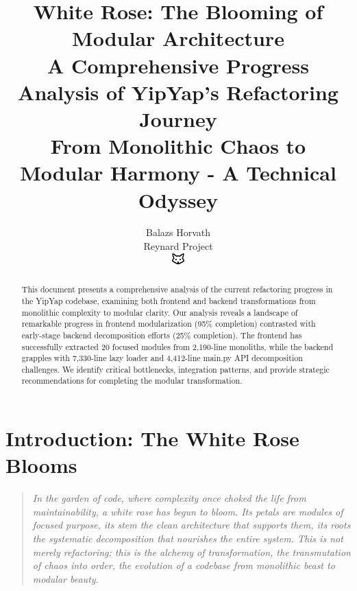 \documentclass[11pt]{article}
\begin{document}
\title{\textbf{White Rose: The Blooming of Modular Architecture} \\
\Large{A Comprehensive Progress Analysis of YipYap's Refactoring Journey} \\
\large{From Monolithic Chaos to Modular Harmony - A Technical Odyssey}}

\author{Balazs Horvath\\
Reynard Project\\
\includegraphics[width=0.5cm]{../../shared-assets/favicon.pdf}}

\maketitle

\begin{abstract}
This document presents a comprehensive analysis of the current refactoring progress in the YipYap codebase, examining both frontend and backend transformations from monolithic complexity to modular clarity. Our analysis reveals a landscape of remarkable progress in frontend modularization (95\% completion) contrasted with early-stage backend decomposition efforts (25\% completion). The frontend has successfully extracted 20 focused modules from 2,190-line monoliths, while the backend grapples with 7,330-line lazy loader and 4,412-line main.py API decomposition challenges. We identify critical bottlenecks, integration patterns, and provide strategic recommendations for completing the modular transformation.
\end{abstract}

\tableofcontents
\newpage

\section{Introduction: The White Rose Blooms}

\begin{quote}
\emph{In the garden of code, where complexity once choked the life from maintainability, a white rose has begun to bloom. Its petals are modules of focused purpose, its stem the clean architecture that supports them, its roots the systematic decomposition that nourishes the entire system. This is not merely refactoring; this is the alchemy of transformation, the transmutation of chaos into order, the evolution of a codebase from monolithic beast to modular beauty.}
\end{quote}
\end{document}

